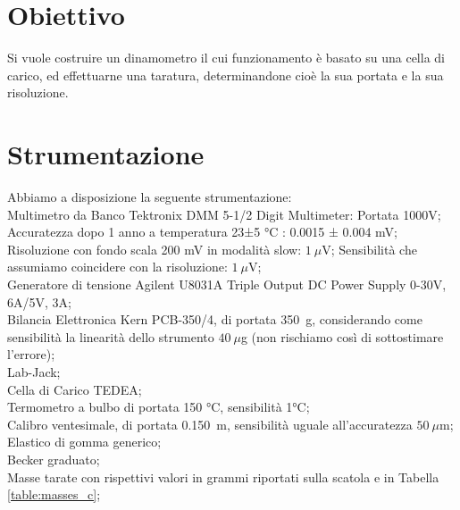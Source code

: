 \documentclass[italian, a4paper, 10pt, twocolumn]{../../style/lab_unige}
\newcommand{\reftab}[1]{Tabella {\ref{#1}}}%
\begin{document}

    \section{Obiettivo}
    \label{section:aim}

    Si vuole costruire un dinamometro il cui funzionamento è basato su una cella di carico, ed effettuarne una taratura, determinandone cioè la sua portata e la sua risoluzione.

    \section{Strumentazione}
    \label{section:strument}

    Abbiamo a disposizione la seguente strumentazione:\\
    Multimetro da Banco Tektronix DMM 5-1/2 Digit Multimeter:
    Portata 1000V;
    Accuratezza dopo 1 anno a temperatura 23±5 °C : 0.0015 ± 0.004 mV;
    Risoluzione con fondo scala 200 mV in modalità slow: $1~\mu$V;
    Sensibilità che assumiamo coincidere con la risoluzione: $1~\mu$V;\\
    Generatore di tensione Agilent U8031A Triple Output DC Power Supply 0-30V, 6A/5V, 3A;\\
    Bilancia Elettronica Kern PCB-350/4, di portata 350~g, considerando come sensibilità la linearità dello strumento $40~\mu$g (non rischiamo così di sottostimare l'errore);\\
    Lab-Jack;\\
    Cella di Carico TEDEA;\\
    Termometro a bulbo di portata 150 °C, sensibilità 1°C;\\
    Calibro ventesimale, di portata 0.150~m, sensibilità uguale all'accuratezza $50~\mu$m;\\
    Elastico di gomma generico;\\
    Becker graduato;\\
    Masse tarate con rispettivi valori in grammi riportati sulla scatola e in \reftab{table:masses_c};\\
\end{document}
